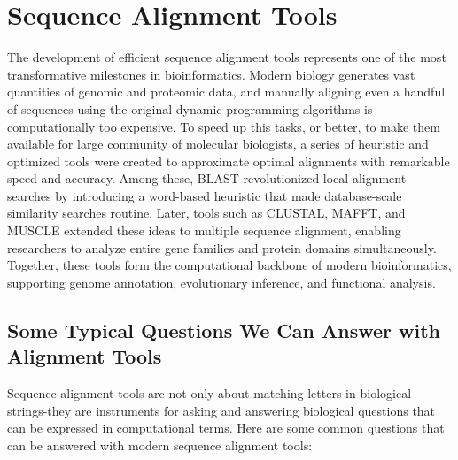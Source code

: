 \chapter{Sequence Alignment Tools}
\label{ch:alignment-tools}

The development of efficient sequence alignment tools represents one of the most transformative milestones in bioinformatics. Modern biology generates vast quantities of genomic and proteomic data, and manually aligning even a handful of sequences using the original dynamic programming algorithms is computationally too expensive. To speed up this tasks, or better, to make them available for large community of molecular biologists, a series of heuristic and optimized tools were created to approximate optimal alignments with remarkable speed and accuracy. Among these, BLAST
revolutionized local alignment searches by introducing a word-based heuristic that made database-scale similarity searches routine. Later, tools such as CLUSTAL, MAFFT, and MUSCLE extended these ideas to multiple sequence alignment, enabling researchers to analyze entire gene families and protein domains simultaneously. Together, these tools form the computational backbone of modern bioinformatics, supporting genome annotation, evolutionary inference, and functional analysis.

\section{Some Typical Questions We Can Answer with Alignment Tools}

Sequence alignment tools are not only about matching letters in biological strings-they are instruments for asking and answering biological questions that can be expressed in computational terms. Here are some common questions that can be answered with modern sequence alignment tools:

